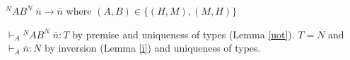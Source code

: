 \begin{case}
$^{N}AB^{N}\;\overline{n}\rightarrow\overline{n}$ where $(A,B)\in\lbrace(H,M),(M,H)\rbrace$

$\vdash_{A}{^{N}A}B^{N}\;\overline{n}:T$ by premise and uniqueness of types (Lemma \ref{uot}).  $T=N$ and $\vdash_{A}\overline{n}:N$ by inversion (Lemma \ref{i}) and uniqueness of types.
\end{case}